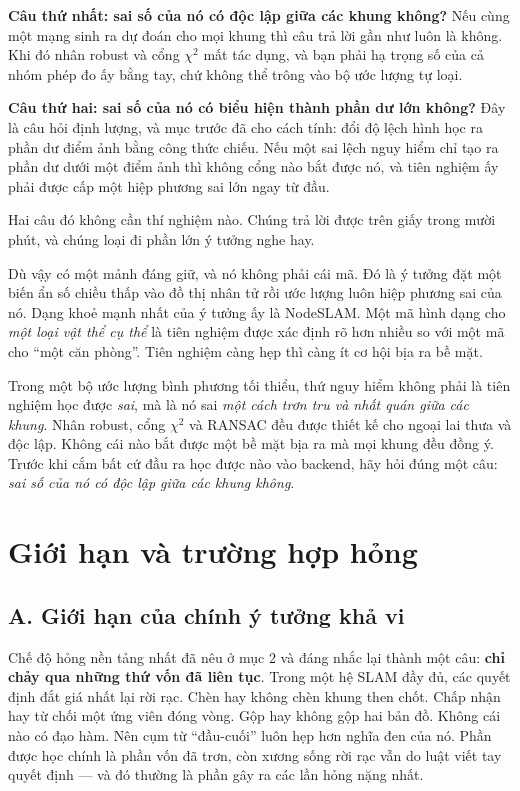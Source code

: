 \documentclass[../../deep_learning.tex]{subfiles}
\begin{document}
\textbf{Câu thứ nhất: sai số của nó có độc lập giữa các khung không?} Nếu cùng một mạng sinh ra dự đoán cho mọi khung thì câu trả lời gần như luôn là không. Khi đó nhân robust và cổng \(\chi^2\) mất tác dụng, và bạn phải hạ trọng số của cả nhóm phép đo ấy bằng tay, chứ không thể trông vào bộ ước lượng tự loại.

\textbf{Câu thứ hai: sai số của nó có biểu hiện thành phần dư lớn không?} Đây là câu hỏi định lượng, và mục trước đã cho cách tính: đổi độ lệch hình học ra phần dư điểm ảnh bằng công thức chiếu. Nếu một sai lệch nguy hiểm chỉ tạo ra phần dư dưới một điểm ảnh thì không cổng nào bắt được nó, và tiên nghiệm ấy phải được cấp một hiệp phương sai lớn ngay từ đầu.

Hai câu đó không cần thí nghiệm nào. Chúng trả lời được trên giấy trong mười phút, và chúng loại đi phần lớn ý tưởng nghe hay.

Dù vậy có một mảnh đáng giữ, và nó không phải cái mã. Đó là ý tưởng đặt một biến ẩn số chiều thấp vào đồ thị nhân tử rồi ước lượng luôn hiệp phương sai của nó. Dạng khoẻ mạnh nhất của ý tưởng ấy là NodeSLAM. Một mã hình dạng cho \emph{một loại vật thể cụ thể} là tiên nghiệm được xác định rõ hơn nhiều so với một mã cho ``một căn phòng''. Tiên nghiệm càng hẹp thì càng ít cơ hội bịa ra bề mặt.

\begin{cannho}
Trong một bộ ước lượng bình phương tối thiểu, thứ nguy hiểm không phải là tiên nghiệm học được \emph{sai}, mà là nó sai \emph{một cách trơn tru và nhất quán giữa các khung}. Nhân robust, cổng \(\chi^2\) và RANSAC đều được thiết kế cho ngoại lai thưa và độc lập. Không cái nào bắt được một bề mặt bịa ra mà mọi khung đều đồng ý. Trước khi cắm bất cứ đầu ra học được nào vào backend, hãy hỏi đúng một câu: \emph{sai số của nó có độc lập giữa các khung không}. 
\end{cannho}

\section{Giới hạn và trường hợp hỏng}

\subsection{A. Giới hạn của chính ý tưởng khả vi}
Chế độ hỏng nền tảng nhất đã nêu ở mục 2 và đáng nhắc lại thành một câu: \textbf{ chỉ chảy qua những thứ vốn đã liên tục}. Trong một hệ SLAM đầy đủ, các quyết định đắt giá nhất lại rời rạc. Chèn hay không chèn khung then chốt. Chấp nhận hay từ chối một ứng viên đóng vòng. Gộp hay không gộp hai bản đồ. Không cái nào có đạo hàm. Nên cụm từ ``đầu-cuối'' luôn hẹp hơn nghĩa đen của nó. Phần được học chính là phần vốn đã trơn, còn xương sống rời rạc vẫn do luật viết tay quyết định --- và đó thường là phần gây ra các lần hỏng nặng nhất.
\end{document}
